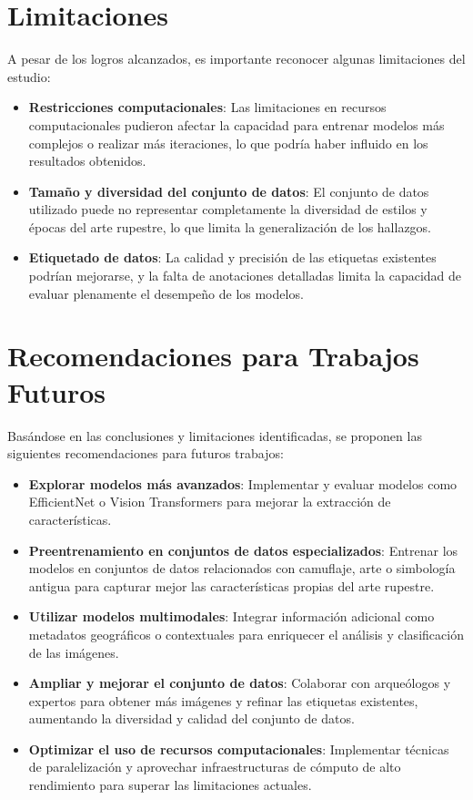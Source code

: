 \section{Limitaciones}

A pesar de los logros alcanzados, es importante reconocer algunas limitaciones del estudio:

\begin{itemize}
    \item \textbf{Restricciones computacionales}: Las limitaciones en recursos computacionales pudieron afectar la capacidad para entrenar modelos más complejos o realizar más iteraciones, lo que podría haber influido en los resultados obtenidos.
    \item \textbf{Tamaño y diversidad del conjunto de datos}: El conjunto de datos utilizado puede no representar completamente la diversidad de estilos y épocas del arte rupestre, lo que limita la generalización de los hallazgos.
    \item \textbf{Etiquetado de datos}: La calidad y precisión de las etiquetas existentes podrían mejorarse, y la falta de anotaciones detalladas limita la capacidad de evaluar plenamente el desempeño de los modelos.
\end{itemize}

\section{Recomendaciones para Trabajos Futuros}

Basándose en las conclusiones y limitaciones identificadas, se proponen las siguientes recomendaciones para futuros trabajos:

\begin{itemize}
    \item \textbf{Explorar modelos más avanzados}: Implementar y evaluar modelos como EfficientNet o Vision Transformers para mejorar la extracción de características.
    \item \textbf{Preentrenamiento en conjuntos de datos especializados}: Entrenar los modelos en conjuntos de datos relacionados con camuflaje, arte o simbología antigua para capturar mejor las características propias del arte rupestre.
    \item \textbf{Utilizar modelos multimodales}: Integrar información adicional como metadatos geográficos o contextuales para enriquecer el análisis y clasificación de las imágenes.
    \item \textbf{Ampliar y mejorar el conjunto de datos}: Colaborar con arqueólogos y expertos para obtener más imágenes y refinar las etiquetas existentes, aumentando la diversidad y calidad del conjunto de datos.
    \item \textbf{Optimizar el uso de recursos computacionales}: Implementar técnicas de paralelización y aprovechar infraestructuras de cómputo de alto rendimiento para superar las limitaciones actuales.
\end{itemize}

